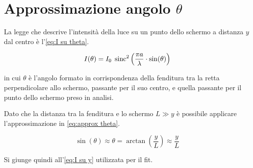 \documentclass[../main.tex]{subfiles}
\begin{document}
\section{Approssimazione angolo $\theta$} \label{sec:approssimazione theta}

La legge che descrive l'intensità della luce su un punto dello schermo a distanza $y$ dal centro è l'\autoref{eq:I su theta}.

\begin{equation} \label{eq:I su theta}
    I(\theta) = I_{0} \; \operatorname{sinc}^{2} \left( \frac{\pi a}{\lambda} \cdot \sin(\theta)  \right)
\end{equation}

in cui $\theta$ è l'angolo formato in corrispondenza della fenditura tra la retta perpendicolare allo schermo, passante per il suo centro, e quella passante per il punto dello schermo preso in analisi.

Dato che la distanza tra la fenditura e lo schermo $L \gg y$ è possibile applicare l'approssimazione in \autoref{eq:approx theta}.

\begin{equation} \label{eq:approx theta}
    \sin(\theta) \approx \theta = \arctan\left( \frac{y}{L} \right) \approx \frac{y}{L} 
\end{equation}

Si giunge quindi all'\autoref{eq:I su y} utilizzata per il fit.
\end{document}
